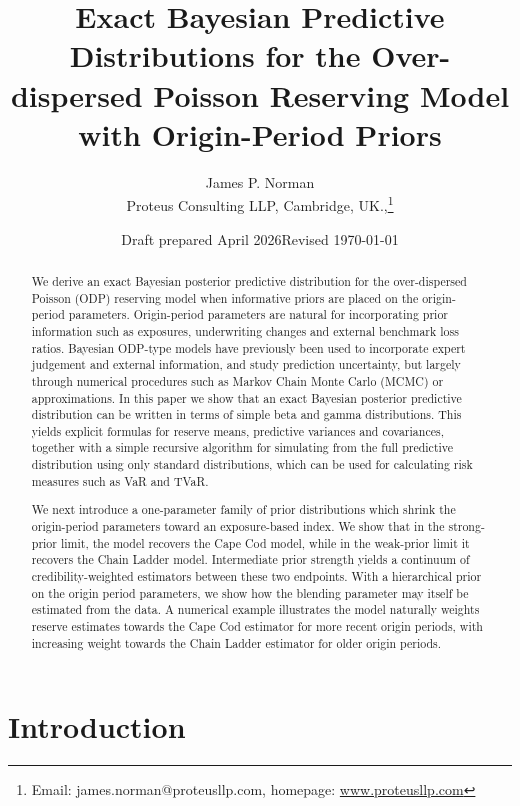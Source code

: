 \documentclass[11pt]{article}
\title{Exact Bayesian Predictive Distributions for the Over-dispersed Poisson Reserving Model with Origin-Period Priors\\[4pt]}
\author{James P. Norman \\Proteus Consulting LLP, Cambridge, UK.,\footnote{Email: james.norman@proteusllp.com, homepage: \url{www.proteusllp.com}}}
\date{Draft prepared April 2026}
\date{Revised \today}
\newcommand{\1}{\mathbf{1}}
\begin{document}
\maketitle


\begin{abstract}
We derive an exact Bayesian posterior predictive distribution for the over-dispersed Poisson (ODP) reserving model when informative priors are placed on the origin-period parameters. Origin-period parameters are natural for incorporating prior information 
such as exposures, underwriting changes and external benchmark loss ratios.
Bayesian ODP-type models have previously been used to incorporate expert judgement and external information, and study prediction uncertainty, but largely through numerical procedures such as Markov Chain Monte Carlo (MCMC)
or approximations. In this paper we show that an exact Bayesian posterior predictive distribution can be written in terms of simple beta and gamma distributions. This yields explicit formulas for reserve means, predictive variances and covariances, 
together with a simple recursive algorithm for simulating from the full predictive distribution using only standard distributions, which can be used for calculating risk measures such as VaR and TVaR.

We next introduce a one-parameter family of prior distributions which shrink the origin-period parameters toward an exposure-based index. We show that
in the strong-prior limit, the model recovers the Cape Cod model, while in the weak-prior limit it recovers the Chain Ladder model. Intermediate prior strength yields a continuum of credibility-weighted estimators between these two endpoints. 
With a hierarchical prior on the origin period parameters, we show how the blending parameter may itself be estimated from the data. A numerical
example illustrates the model naturally weights reserve estimates towards the Cape Cod estimator for more recent
origin periods, with increasing weight towards the Chain Ladder estimator for older origin periods.
\end{abstract}


\section{Introduction}
\end{document}
